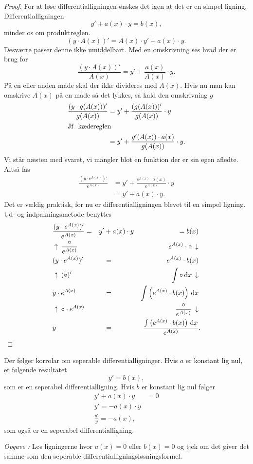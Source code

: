 \documentclass{article}
\newcounter{opgavecnt}
\newcommand{\opg}[1]{\stepcounter{opgavecnt}\textit{Opgave \arabic{opgavecnt}: }#1}
\begin{document}
\begin{proof}
	For at løse differentialligningen ønskes det igen at det er en simpel
	ligning. Differentialligningen
	\[
		y' + a(x) \cdot y = b(x),
	\] 
	minder os om produktreglen.
	\[
		(y \cdot A(x))' = A(x) \cdot y' + a(x) \cdot y.
	\] 
	Desværre passer denne ikke umiddelbart. Med en omskrivning ses hvad der er
	brug for
	\[
		\frac{(y \cdot A(x))'}{A(x)} = y' + \frac{a(x)}{A(x)} \cdot y.
	\] 
	På en eller anden måde skal der ikke divideres med $A(x)$. Hvis nu man kan
	omskrive $A(x)$ på en måde så det lykkes, så kald den omskrivning $g$
	\begin{align*}
		\frac{(y \cdot g(A(x)))'}{g(A(x))} &= y' + \frac{(g(A(x)))'}{g(A(x))} \cdot y\\
		\intertext{Jf. kædereglen}
										   &= y' + \frac{g'(A(x)) \cdot a(x)}{g(A(x))} \cdot y.
	\end{align*}
	Vi står næsten med svaret, vi mangler blot en funktion der er sin egen
	afledte. Altså fås
	\begin{align*}
		\frac{(y \cdot e^{A(x)})'}{e^{A(x)}} &= y' + \frac{e^{A(x)} \cdot a(x)}{e^{A(x)}} \cdot y\\
											 &= y' + a(x) \cdot y.
	\end{align*}
	Det er vældig praktisk, for nu er differentialligningen blevet til en
	simpel ligning. Ud- og indpakningsmetode benyttes
	\begin{align*}
		&\frac{(y \cdot e^{A(x)})'}{e^{A(x)}} =& y' &+ a(x) \cdot y &= b(x)&\\
		&\uparrow\: \frac{\circ}{e^{A(x)}} &&& e^{A(x)} \cdot \circ \: \downarrow&\\
		&(y \cdot e^{A(x)})' &&=& e^{A(x)} \cdot b(x)&\\
		&\uparrow\: ( \circ )' &&& \int \circ \,\mathrm{d} x \: \downarrow&\\
		&y \cdot e^{A(x)} &&=& \int \left(e^{A(x)} \cdot b(x)\right) \,\mathrm{d} x&\\
		&\uparrow\: \circ \cdot e^{A(x)} &&& \frac{\circ}{e^{A(x)}} \: \downarrow&\\
		&y &&=& \frac{\int \left(e^{A(x)} \cdot b(x)\right) \,\mathrm{d} x}{e^{A(x)}}&.\qedhere
	\end{align*}
\end{proof}

Der følger korrolar om seperable differentialligninger. Hvis $a$ er konstant
lig nul, er følgende resultatet
\[
	y' = b(x),
\] 
som er en seperabel differentialligning. Hvis $b$ er konstant lig nul følger
\begin{align*}
	y' + a(x) \cdot y &= 0\\
	y' = -a(x) \cdot y\\
	\frac{y'}{y} = -a(x),
\end{align*}
som også er en seperabel differentialligning.

\opg{Løs ligningerne hvor $a(x) = 0$ eller $b(x) = 0$ og tjek om det giver det
samme som den seperable differentialligningsløsningsformel.}

\printindex
\end{document}
